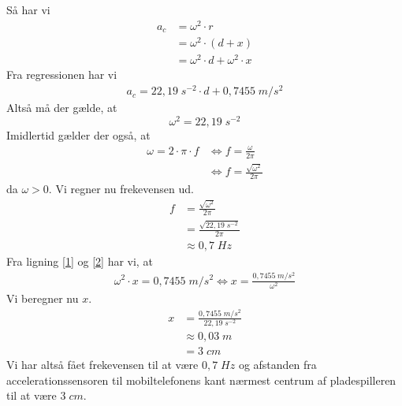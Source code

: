 \documentclass{report}
\begin{document}
Så har vi
\begin{equation}
\label{1}
\begin{split}
  a_c&=\omega^2 \cdot r\\
  &=\omega^2 \cdot (d+x)\\
  &=\omega^2 \cdot d + \omega^2 \cdot x
\end{split}
\end{equation}
Fra regressionen har vi
\begin{equation}
  \label{2}
\begin{split}
a_c=22,19 \;\unit{s^{-2}} \cdot d + 0,7455 \;\unit{m/s^2} 
\end{split}
\end{equation}
Altså må der gælde, at
\[
\omega^2=22,19 \;\unit{s ^{-2}} 
\] 
Imidlertid gælder der også, at
\begin{equation*}
\begin{split}
  \omega=2 \cdot \pi \cdot f &\iff f=\frac{\omega }{2 \pi }\\
  &\iff f=\frac{\sqrt{\omega^2} }{2 \pi }
\end{split}
\end{equation*}
da $\omega>0 $.
Vi regner nu frekevensen ud.
\begin{equation*}
\begin{split}
  f&=\frac{\sqrt{\omega^2} }{2 \pi }\\
  &=\frac{\sqrt{22,19 \;\unit{s ^{-2}} }  }{2 \pi }\\
  &\approx 0,7 \;\unit{Hz} 
\end{split}
\end{equation*}
Fra ligning \ref{1} og \ref{2} har vi, at
\begin{equation*}
\begin{split}
  \omega^2 \cdot x=0,7455 \;\unit{m/s^2} \iff x=\frac{0,7455 \;\unit{m/s^2} }{\omega^2}
\end{split}
\end{equation*}
Vi beregner nu $x$.
\begin{equation*}
\begin{split}
  x&=\frac{0,7455 \;\unit{m/s^2} }{22,19 \;\unit{s ^{-2}} }\\
  &\approx 0,03 \;\unit{m} \\
  &=3 \;\unit{cm} 
\end{split}
\end{equation*}
Vi har altså fået frekevensen til at være $0,7 \;\unit{Hz} $ og afstanden fra accelerationssensoren til mobiltelefonens kant nærmest centrum af pladespilleren til at være $3 \;\unit{cm} $. 
\end{document}
